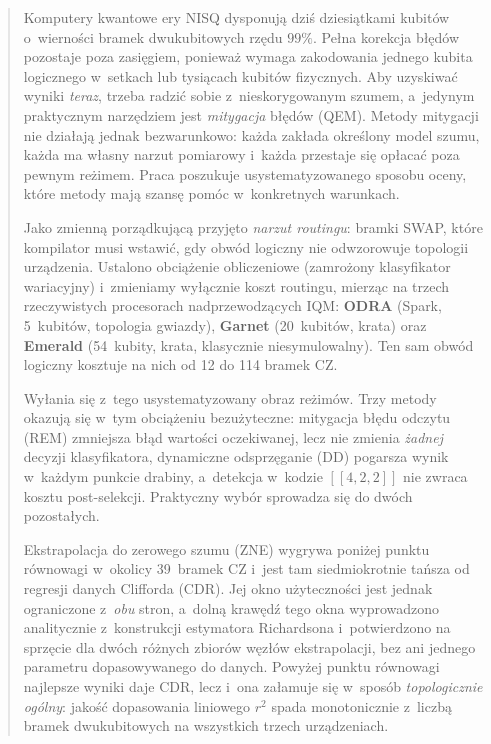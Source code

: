 \documentclass[11pt]{article}
\begin{document}
\begin{abstract}
Komputery kwantowe ery NISQ dysponują dziś dziesiątkami kubitów o~wierności bramek dwukubitowych
rzędu $99\%$. Pełna korekcja błędów pozostaje poza zasięgiem, ponieważ wymaga zakodowania jednego
kubita logicznego w~setkach lub tysiącach kubitów fizycznych. Aby uzyskiwać wyniki
\emph{teraz}, trzeba radzić sobie z~nieskorygowanym szumem, a~jedynym praktycznym narzędziem jest
\emph{mitygacja} błędów (QEM). Metody mitygacji nie działają jednak bezwarunkowo: każda zakłada
określony model szumu, każda ma własny narzut pomiarowy i~każda przestaje się opłacać poza pewnym
reżimem. Praca poszukuje usystematyzowanego sposobu oceny, które metody mają szansę pomóc
w~konkretnych warunkach.

Jako zmienną porządkującą przyjęto \emph{narzut routingu}: bramki SWAP, które kompilator musi
wstawić, gdy obwód logiczny nie odwzorowuje topologii urządzenia. Ustalono
obciążenie obliczeniowe (zamrożony klasyfikator wariacyjny) i~zmieniamy wyłącznie koszt routingu,
mierząc na trzech rzeczywistych procesorach nadprzewodzących IQM: \textbf{ODRA} (Spark, 5~kubitów,
topologia gwiazdy), \textbf{Garnet} (20~kubitów, krata) oraz \textbf{Emerald} (54~kubity, krata,
klasycznie niesymulowalny). Ten sam obwód logiczny kosztuje na nich od 12 do 114 bramek CZ.

Wyłania się z~tego usystematyzowany obraz reżimów. Trzy metody okazują się w~tym obciążeniu
bezużyteczne: mitygacja błędu odczytu (REM) zmniejsza błąd wartości oczekiwanej, lecz nie zmienia
\emph{żadnej} decyzji klasyfikatora, dynamiczne odsprzęganie (DD) pogarsza wynik w~każdym punkcie
drabiny, a~detekcja w~kodzie $[[4,2,2]]$ nie zwraca kosztu post-selekcji. Praktyczny wybór sprowadza
się do dwóch pozostałych.

Ekstrapolacja do zerowego szumu (ZNE) wygrywa poniżej punktu równowagi w~okolicy 39~bramek CZ
i~jest tam siedmiokrotnie tańsza od regresji danych Clifforda (CDR). Jej okno użyteczności jest
jednak ograniczone z~\emph{obu} stron, a~dolną krawędź tego okna wyprowadzono analitycznie
z~konstrukcji estymatora Richardsona i~potwierdzono na sprzęcie dla dwóch różnych zbiorów węzłów
ekstrapolacji, bez ani jednego parametru dopasowywanego do danych. Powyżej punktu równowagi
najlepsze wyniki daje CDR, lecz i~ona załamuje się w~sposób \emph{topologicznie ogólny}: jakość
dopasowania liniowego $r^2$ spada monotonicznie z~liczbą bramek dwukubitowych na wszystkich trzech
urządzeniach.


\end{abstract}
\end{document}
